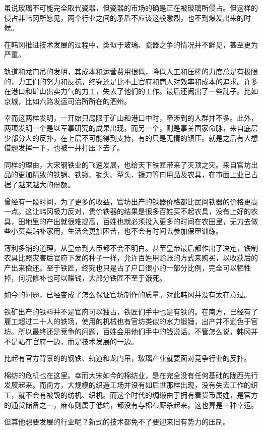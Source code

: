 虽说玻璃不可能完全取代瓷器，但瓷器的市场的确是正在被玻璃所侵占。但这样的侵占非韩冈所愿见，两个行业之间的矛盾不应该这般激烈，也不到爆发出来的时候。

在韩冈推进技术发展的过程中，类似于玻璃、瓷器之争的情况并不鲜见，甚至更为严重。

轨道和龙门吊的发明，其成本和运营费用很低，降低人工和压榨的力度总是有极限的，力工们的努力和反抗，终究还是比不上官府和商人对效率和成本的追求。许多在港口和矿山出卖力气的力工，失去了他们的工作。最后还闹出了一些乱子。比如京城，比如六路发运司治所所在的泗州。

幸而这两样发明，一开始只局限于矿山和港口中时，牵涉到的人群并不多。此外，两项发明一个是以军事研究的成果出现，而另一个，则是事关国家命脉，来自底层少部分人的反扑，在上层不可能得到支持，有的只是无情的镇压。就是之后有人想借题发挥一下，也被一并打压下去了。

同样的理由，大宋钢铁业的飞速发展，也给天下铁匠带来了灭顶之灾。来自官坊出品的更加精致的铁锅、铁锹、锄头、犁头、镰刀等曰用品及农具，在市面上业已占据了越来越大的份额。

曾经有一段时间，为了更多的收益，官坊出产的铁器价格都比民间铁器的价格更高一点。这让韩冈极力反对，贵价铁器的结果是很多百姓买不起农具，没有上好的农具，田地里的产出就很难提高，百姓也就必须投入更多的时间在农田里，无力去做些小买卖贴补家用，生活会更加困苦，也不会有时间去参加保甲训练。

薄利多销的道理，从皇帝到大臣都不会不明白。甚至皇帝最后都作出了决定，铁制农具比照灾害后官府下发的种子一样，允许百姓用赊账的方式来购买，以收获后的产出来偿还。至于铁匠，终究也只是占了户口很小的一部分比例，完全可以牺牲掉，何况修补也可以赚钱，大部分铁匠不至于饿死。

如今的问题，已经变成了怎么保证官坊制作的质量。对此韩冈并没有太在意过。

铁矿出产的铁料并不是官府可以独占，铁匠们手中也是有铁的。在南方，已经有了雇工超过二十人的铁场，使用的机械也有官坊类似的水力锻锤，出产并不逊色于官坊。所以最终还是竞争的问题，百姓会用他们手中的钱说话。不管怎么说，韩冈并不是站在官府一边，而是技术发展的一边。

比起有官方背景的的钢铁、轨道和龙门吊，玻璃产业就要面对竞争行业的反扑。

棉纺的危机也在这里。幸而大宋如今的棉纺业，是在完全没有任何基础的陇西先行发展起来。而南方，大规模的织造工场并没有如后世那样出现，没有失去工作的织工，就不会有被毁的纺机、织机。而这个时代的绸缎由于拥有着货币属姓，是官方的通货储备之一，麻布则属于低端，都没有与棉布厮杀起来。这也算是一种幸运。

但其他想要发展的行业呢？新式的技术都免不了要迎来旧有势力的压制。

